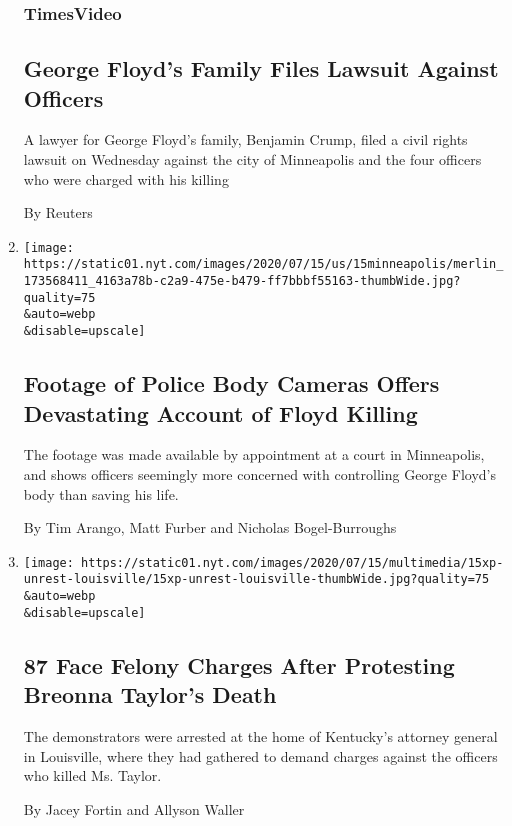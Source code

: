 \begin{enumerate}
  \hypertarget{timesvideo}{%
  \subsubsection{TimesVideo}\label{timesvideo}}

  \hypertarget{george-floyds-family-files-lawsuit-against-officers}{%
  \subsection{George Floyd's Family Files Lawsuit Against
  Officers}\label{george-floyds-family-files-lawsuit-against-officers}}

  A lawyer for George Floyd's family, Benjamin Crump, filed a civil
  rights lawsuit on Wednesday against the city of Minneapolis and the
  four officers who were charged with his killing

  By Reuters
\item
  \href{/2020/07/15/us/george-floyd-video-killing.html}{}

  \texttt{[image: https://static01.nyt.com/images/2020/07/15/us/15minneapolis/merlin\_173568411\_4163a78b-c2a9-475e-b479-ff7bbbf55163-thumbWide.jpg?quality=75\\\&auto=webp\\\&disable=upscale]}

  \hypertarget{footage-of-police-body-cameras-offers-devastating-account-of-floyd-killing}{%
  \subsection{Footage of Police Body Cameras Offers Devastating Account
  of Floyd
  Killing}\label{footage-of-police-body-cameras-offers-devastating-account-of-floyd-killing}}

  The footage was made available by appointment at a court in
  Minneapolis, and shows officers seemingly more concerned with
  controlling George Floyd's body than saving his life.

  By Tim Arango, Matt Furber and Nicholas Bogel-Burroughs
\item
  \href{/2020/07/15/us/protesters-arrested-breonna-taylor-kentucky.html}{}

  \texttt{[image: https://static01.nyt.com/images/2020/07/15/multimedia/15xp-unrest-louisville/15xp-unrest-louisville-thumbWide.jpg?quality=75\\\&auto=webp\\\&disable=upscale]}

  \hypertarget{87-face-felony-charges-after-protesting-breonna-taylors-death}{%
  \subsection{87 Face Felony Charges After Protesting Breonna Taylor's
  Death}\label{87-face-felony-charges-after-protesting-breonna-taylors-death}}

  The demonstrators were arrested at the home of Kentucky's attorney
  general in Louisville, where they had gathered to demand charges
  against the officers who killed Ms. Taylor.

  By Jacey Fortin and Allyson Waller
\end{enumerate}

